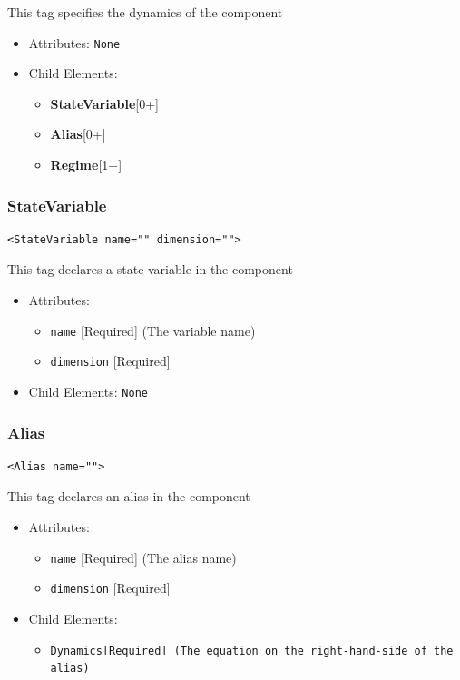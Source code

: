 \documentclass{article}
\newcommand{\MathInline}{\tt{Dynamics}}
\newcommand{\StateVariable}{{\bf{StateVariable}}\xspace}
\newcommand{\Alias}{{\bf{Alias}}\xspace}
\newcommand{\Regime}{{\bf{Regime}}\xspace}
\begin{document}
This tag specifies the dynamics of the component

\begin{itemize}
\item Attributes: \texttt{None}

\item Child Elements:
%
\begin{itemize}
\item \StateVariable {[}0+{]}
\item \Alias {[}0+{]}
\item \Regime {[}1+{]}
\end{itemize}

\end{itemize}

\subsubsection{StateVariable}
%
\begin{lstlisting}
<StateVariable name="" dimension="">
\end{lstlisting}

This tag declares a state-variable in the component

\begin{itemize}
\item Attributes:
%
\begin{itemize}
\item \verb|name| {[}Required{]} (The variable name)
\item \verb|dimension| {[}Required{]}
\end{itemize}

\item Child Elements: \texttt{None}
\end{itemize}

\subsubsection{Alias}
%
\begin{lstlisting}
<Alias name="">
\end{lstlisting}

This tag declares an alias in the component

\begin{itemize}
\item Attributes:
\begin{itemize}
\item \verb|name| {[}Required{]} (The alias name)
\item \verb|dimension| {[}Required{]}
\end{itemize}

\item Child Elements:
\begin{itemize}
\item \MathInline {[}Required{]} (The equation on the right-hand-side of the alias)
\end{itemize}
\end{itemize}
\end{document}
